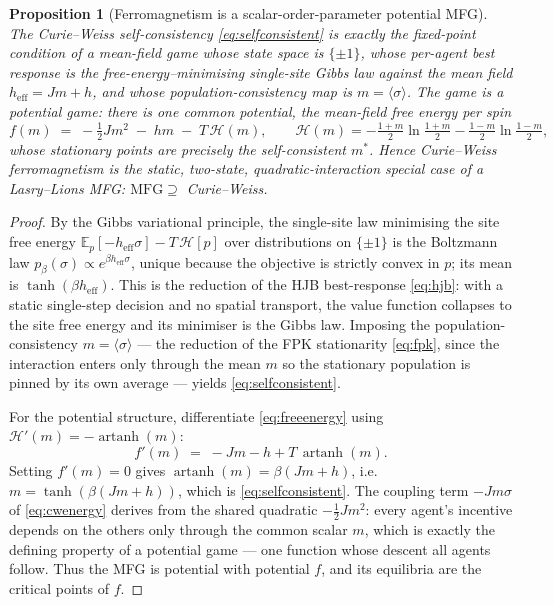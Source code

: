 \documentclass[11pt]{article}
\newtheorem{proposition}{Proposition}
\newcommand{\E}{\mathbb{E}}
\newcommand{\avg}[1]{\langle #1 \rangle}
\newcommand{\heff}{h_{\mathrm{eff}}}
\DeclareMathOperator{\artanh}{artanh}
\begin{document}
\begin{proposition}[Ferromagnetism is a scalar-order-parameter potential MFG]
\label{prop:isomorphism}
The Curie--Weiss self-consistency \eqref{eq:selfconsistent} is exactly the fixed-point condition of a mean-field
game whose state space is $\{\pm1\}$, whose per-agent best response is the free-energy--minimising single-site
Gibbs law against the mean field $\heff=Jm+h$, and whose population-consistency map is $m=\avg{\sigma}$.
The game is a \emph{potential} game: there is one common potential, the mean-field free energy per spin
\begin{equation}
f(m) \;=\; -\tfrac12 J m^2 \;-\; h m \;-\; T\,\mathcal{H}(m), \qquad
\mathcal{H}(m) = -\tfrac{1+m}{2}\ln\tfrac{1+m}{2} - \tfrac{1-m}{2}\ln\tfrac{1-m}{2},
\label{eq:freeenergy}
\end{equation}
whose stationary points are precisely the self-consistent $m^{*}$. Hence Curie--Weiss ferromagnetism is the
static, two-state, quadratic-interaction special case of a Lasry--Lions MFG: $\mathrm{MFG}\supseteq$
Curie--Weiss.
\end{proposition}

\begin{proof}
By the Gibbs variational principle, the single-site law minimising the site free energy
$\E_p[-\heff\sigma]-T\,\mathcal{H}[p]$ over distributions on $\{\pm1\}$ is the Boltzmann law
$p_\beta(\sigma)\propto e^{\beta\heff\sigma}$, unique because the objective is strictly convex in $p$; its mean
is $\tanh(\beta\heff)$. This is the reduction of the HJB best-response \eqref{eq:hjb}: with a static single-step
decision and no spatial transport, the value function collapses to the site free energy and its minimiser is the
Gibbs law. Imposing the population-consistency $m=\avg{\sigma}$ --- the reduction of the FPK stationarity
\eqref{eq:fpk}, since the interaction enters only through the mean $m$ so the stationary population is pinned by
its own average --- yields \eqref{eq:selfconsistent}.

For the potential structure, differentiate \eqref{eq:freeenergy} using $\mathcal{H}'(m)=-\artanh(m)$:
\[
f'(m) \;=\; -Jm - h + T\,\artanh(m).
\]
Setting $f'(m)=0$ gives $\artanh(m)=\beta(Jm+h)$, i.e. $m=\tanh(\beta(Jm+h))$, which is
\eqref{eq:selfconsistent}. The coupling term $-Jm\sigma$ of \eqref{eq:cwenergy} derives from the shared
quadratic $-\tfrac12 Jm^2$: every agent's incentive depends on the others only through the common scalar $m$,
which is exactly the defining property of a potential game --- one function whose descent all agents follow.
Thus the MFG is potential with potential $f$, and its equilibria are the critical points of $f$.
\end{proof}
\end{document}

